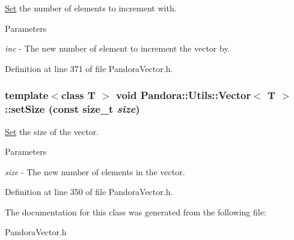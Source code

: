 \hyperlink{classPandora_1_1Utils_1_1Set}{Set} the number of elements to increment with. 
\begin{DoxyParams}{Parameters}
\item[{\em inc}]-\/ The new number of element to increment the vector by. \end{DoxyParams}


Definition at line 371 of file PandoraVector.h.\hypertarget{classPandora_1_1Utils_1_1Vector_adc9658f8a19f67e7e92b43c5bd4206c7}{
\subsubsection[{setSize}]{\setlength{\rightskip}{0pt plus 5cm}template$<$class T $>$ void {\bf Pandora::Utils::Vector}$<$ T $>$::setSize (const size\_\-t {\em size})}}
\label{classPandora_1_1Utils_1_1Vector_adc9658f8a19f67e7e92b43c5bd4206c7}


\hyperlink{classPandora_1_1Utils_1_1Set}{Set} the size of the vector. 
\begin{DoxyParams}{Parameters}
\item[{\em size}]-\/ The new number of elements in the vector. \end{DoxyParams}


Definition at line 350 of file PandoraVector.h.

The documentation for this class was generated from the following file:\begin{DoxyCompactItemize}
\item 
PandoraVector.h\end{DoxyCompactItemize}

